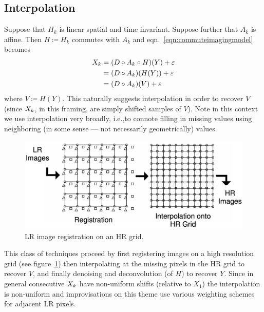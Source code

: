 \subsection{Interpolation}\label{subsec:interpolation}

Suppose that \(H_k\) is linear spatial and time invariant.
%
Suppose further that \(A_k\) is affine.
%
Then \(H \coloneqq H_k\) commutes with \(A_k\)\cite{meladcommute} and eqn.~\eqref{eqn:commuteimagingmodel} becomes
\begin{equation}
	\label{eqn:commuteimagingmodel}
	\begin{split}
		\Xk &= (D \circ A_k \circ H) (Y) + \varepsilon \\
		&= (D \circ A_k) (H(Y)) + \varepsilon \\
		&= (D \circ A_k) (V) + \varepsilon
	\end{split}
\end{equation}
%
where \(V \coloneqq H(Y)\).
%
This naturally suggests interpolation in order to recover \(V\) (since \(X_k\), in this framing, are simply shifted samples of \(V\)).
%
Note in this context we use interpolation very broadly, i.e.,to connote filling in missing values using neighboring (in some sense --- not necessarily geometrically) values.
%
\begin{figure}
	\centering
	\includegraphics[width=\linewidth,keepaspectratio]{figures/classical/hrgrid.png}
	\caption{LR image registration on an HR grid\cite{Lin}.}
	\label{fig:hrgrid}
\end{figure}
This class of techniques proceed by first registering images on a high resolution grid (see figure~\ref{fig:hrgrid}) then interpolating at the missing pixels in the HR grid to recover \(V\), and finally denoising and deconvolution (of \(H\)) to recover \(Y\).
%
Since in general consecutive \(X_k\) have non-uniform shifts (relative to \(X_1\)) the interpolation is non-uniform and improvisations on this theme use various weighting schemes for adjacent LR pixels.

